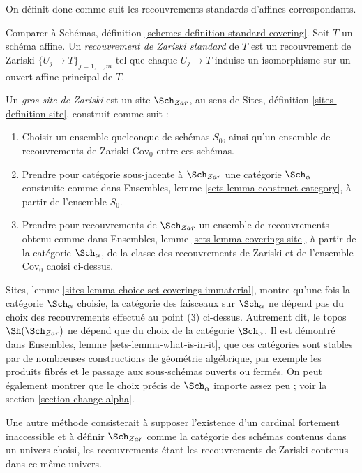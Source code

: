 \noindent
On définit donc comme suit les recouvrements standards d'affines correspondants.

\begin{definition}
\label{definition-standard-Zariski}
Comparer à Schémas, définition \ref{schemes-definition-standard-covering}.
Soit $T$ un schéma affine. Un {\it recouvrement de Zariski standard}
de $T$ est un recouvrement de Zariski $\{U_j \to T\}_{j = 1, \ldots, m}$
tel que chaque $U_j \to T$ induise un isomorphisme sur un ouvert affine principal
de $T$.
\end{definition}

\begin{definition}
\label{definition-big-zariski-site}
Un {\it gros site de Zariski} est un site $\Sch_{Zar}$, au sens de
Sites, définition \ref{sites-definition-site}, construit comme suit :
\begin{enumerate}
\item Choisir un ensemble quelconque de schémas $S_0$, ainsi qu'un ensemble de recouvrements de Zariski
$\text{Cov}_0$ entre ces schémas.
\item Prendre pour catégorie sous-jacente à $\Sch_{Zar}$
une catégorie $\Sch_\alpha$ construite comme dans
Ensembles, lemme \ref{sets-lemma-construct-category}, à partir de l'ensemble $S_0$.
\item Prendre pour recouvrements de $\Sch_{Zar}$ un ensemble de recouvrements obtenu comme dans
Ensembles, lemme \ref{sets-lemma-coverings-site}, à partir de la
catégorie $\Sch_\alpha$, de la classe des recouvrements de Zariski
et de l'ensemble $\text{Cov}_0$ choisi ci-dessus.
\end{enumerate}
\end{definition}

\noindent
Sites, lemme \ref{sites-lemma-choice-set-coverings-immaterial}, montre
qu'une fois la catégorie $\Sch_\alpha$ choisie, la
catégorie des faisceaux sur $\Sch_\alpha$ ne dépend pas du
choix des recouvrements effectué au point (3) ci-dessus. Autrement dit, le topos
$\Sh(\Sch_{Zar})$ ne dépend que du choix de
la catégorie $\Sch_\alpha$. Il est démontré dans
Ensembles, lemme \ref{sets-lemma-what-is-in-it}, que ces catégories
sont stables par de nombreuses constructions de géométrie algébrique, par exemple
les produits fibrés et le passage aux sous-schémas ouverts ou fermés. On peut également montrer
que le choix précis de $\Sch_\alpha$ importe
assez peu ; voir la section \ref{section-change-alpha}.

\medskip\noindent
Une autre méthode consisterait à supposer l'existence d'un
cardinal fortement inaccessible et à définir $\Sch_{Zar}$
comme la catégorie des schémas contenus dans un univers choisi, les
recouvrements étant les recouvrements de Zariski contenus dans ce même
univers.

